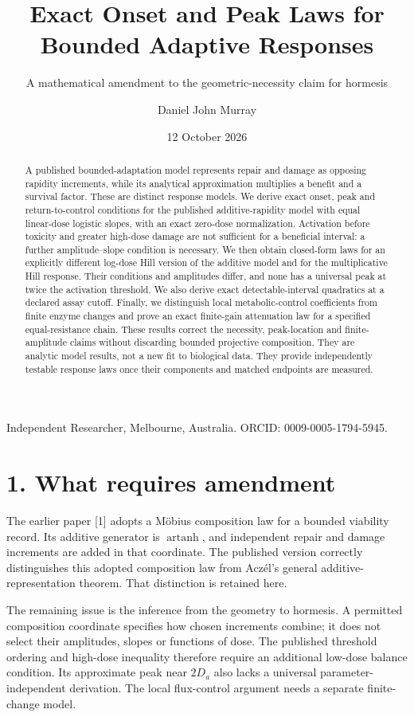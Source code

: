 \documentclass[
  11pt,
  a4paper,
]{article}
\title{Exact Onset and Peak Laws for Bounded Adaptive Responses}
\subtitle{A mathematical amendment to the geometric-necessity claim for hormesis}
\author{Daniel John Murray}
\date{12 October 2026}
\begin{document}
\maketitle
\begin{abstract}
A published bounded-adaptation model represents repair and damage as opposing rapidity increments, while its analytical approximation multiplies a benefit and a survival factor. These are distinct response models. We derive exact onset, peak and return-to-control conditions for the published additive-rapidity model with equal linear-dose logistic slopes, with an exact zero-dose normalization. Activation before toxicity and greater high-dose damage are not sufficient for a beneficial interval: a further amplitude--slope condition is necessary. We then obtain closed-form laws for an explicitly different log-dose Hill version of the additive model and for the multiplicative Hill response. Their conditions and amplitudes differ, and none has a universal peak at twice the activation threshold. We also derive exact detectable-interval quadratics at a declared assay cutoff. Finally, we distinguish local metabolic-control coefficients from finite enzyme changes and prove an exact finite-gain attenuation law for a specified equal-resistance chain. These results correct the necessity, peak-location and finite-amplitude claims without discarding bounded projective composition. They are analytic model results, not a new fit to biological data. They provide independently testable response laws once their components and matched endpoints are measured.
\end{abstract}

Independent Researcher, Melbourne, Australia. ORCID: 0009-0005-1794-5945.

\section{1. What requires amendment}\label{what-requires-amendment}

The earlier paper {[}1{]} adopts a Möbius composition law for a bounded viability record. Its additive generator is \(\operatorname{artanh}\), and independent repair and damage increments are added in that coordinate. The published version correctly distinguishes this adopted composition law from Aczél's general additive-representation theorem. That distinction is retained here.

The remaining issue is the inference from the geometry to hormesis. A permitted composition coordinate specifies how chosen increments combine; it does not select their amplitudes, slopes or functions of dose. The published threshold ordering and high-dose inequality therefore require an additional low-dose balance condition. Its approximate peak near \(2D_a\) also lacks a universal parameter-independent derivation. The local flux-control argument needs a separate finite-change model.
\end{document}
